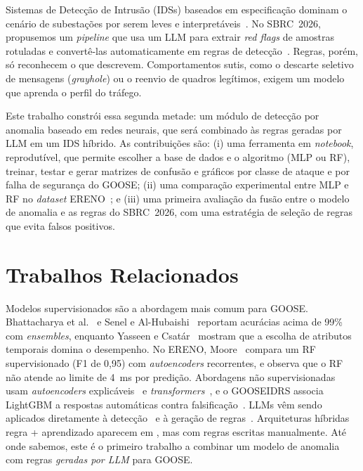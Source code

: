 \documentclass[12pt]{article}
\begin{document}
Sistemas de Detecção de Intrusão (IDSs) baseados em especificação dominam o
cenário de subestações por serem leves e
interpretáveis~\cite{hong2014integrated,yang2017multidimensional,quincozes2021survey}.
No SBRC~2026, propusemos um \textit{pipeline} que usa um LLM para extrair
\textit{red flags} de amostras rotuladas e convertê-las automaticamente em
regras de detecção~\cite{martins2026redflags}. Regras, porém, só reconhecem o
que descrevem. Comportamentos sutis, como o descarte seletivo de mensagens
(\textit{grayhole}) ou o reenvio de quadros legítimos, exigem um modelo que
aprenda o perfil do tráfego.

Este trabalho constrói essa segunda metade: um módulo de detecção por anomalia
baseado em redes neurais, que será combinado às regras geradas por LLM em um
IDS híbrido. As contribuições são:
(i) uma ferramenta em \textit{notebook}, reprodutível, que permite escolher a
base de dados e o algoritmo (MLP ou RF), treinar, testar e gerar matrizes de
confusão e gráficos por classe de ataque e por falha de segurança do GOOSE;
(ii) uma comparação experimental entre MLP e RF no \textit{dataset}
ERENO~\cite{quincozes2024ereno}; e
(iii) uma primeira avaliação da fusão entre o modelo de anomalia e as regras
do SBRC~2026, com uma estratégia de seleção de regras que evita falsos
positivos.

\section{Trabalhos Relacionados}

Modelos supervisionados são a abordagem mais comum para GOOSE.
Bhattacharya et al.~\cite{bhattacharya2024ml} e
Senel e Al-Hubaishi~\cite{senel2026simultaneous} reportam
acurácias acima de 99\% com \textit{ensembles}, enquanto
Yasseen e Csatár~\cite{yasseen2026optimal} mostram que a
escolha de atributos temporais domina o desempenho. No ERENO,
Moore~\cite{moore2026anomaly} compara um RF
supervisionado (F1 de 0,95) com \textit{autoencoders} recorrentes, e observa que o RF
não atende ao limite de 4~ms por predição. Abordagens não supervisionadas usam
\textit{autoencoders} explicáveis~\cite{lozano2026explainable} e
\textit{transformers}~\cite{goyel2026transformer}, e o GOOSEIDRS associa
LightGBM a respostas automáticas contra falsificação~\cite{alberto2026gooseidrs}.
LLMs vêm sendo aplicados diretamente à detecção~\cite{zaboli2025genai,danso2025llm}
e à geração de regras~\cite{hadi2026genti,martins2026redflags}. Arquiteturas
híbridas regra + aprendizado aparecem em \cite{girdhar2024sdn,yoon2025sdn},
mas com regras escritas manualmente. Até onde sabemos, este é o primeiro
trabalho a combinar um modelo de anomalia com regras \emph{geradas por LLM}
para GOOSE.
\end{document}
